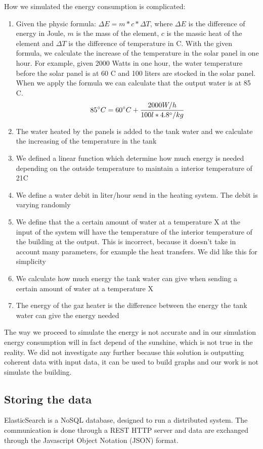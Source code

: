 \documentclass{acm_proc_article-sp}
\begin{document}
How we simulated the energy consumption is complicated:
\begin{enumerate}
\item Given the physic formula: $\Delta E = m*c* \Delta T$, where $\Delta E$ is the difference of energy in Joule, $m$ is the mass of the element, $c$ is the massic heat of the element and $\Delta T$ is the difference of temperature in \degree C. With the given formula, we calculate the increase of the temperature in the solar panel in one hour. For example, given 2000 Watts in one hour, the water temperature before the solar panel is at 60 \degree C and 100 liters are stocked in the solar panel. When we apply the formula we can calculate that the output water is at 85 \degree C.
$$85\degree C = 60 \degree C + \frac{2000W/h}{100l * 4.8\degree / kg}$$
\item The water heated by the panels is added to the tank water and we calculate the increasing of the temperature in the tank
\item We defined a linear function which determine how much energy is needed depending on the outside temperature to maintain a interior temperature of 21\degree C
\item We define a water debit in liter/hour send in the heating system. The debit is varying randomly
\item We define that the a certain amount of water at a temperature X at the input of the system will have the temperature of the interior temperature of the building at the output. This is incorrect, because it doesn’t take in account many parameters, for example the heat transfers. We did like this for simplicity
\item We calculate how much energy the tank water can give when sending a certain amount of water at a temperature X
\item The energy of the gaz heater is the difference between the energy the tank water can give the energy needed
\end{enumerate}

The way we proceed to simulate the energy is not accurate and in our simulation energy consumption will in fact depend of the sunshine, which is not true in the reality. We did not investigate any further because this solution is outputting coherent data with input data, it can be used to build graphs and our work is not simulate the building.
\subsection{Storing the data}
\label{storing_data}
ElasticSearch is a NoSQL database, designed to run a distributed system. The communication is done through a REST HTTP server \cite{Fielding2000} and data are exchanged through the Javascript Object Notation (JSON) \cite{json} format.
\end{document}
